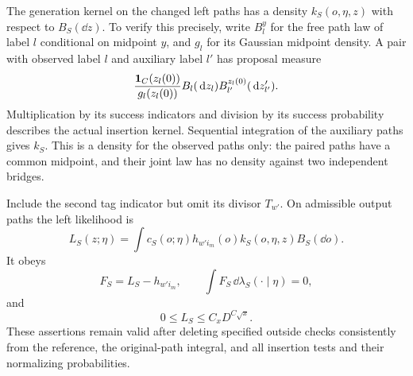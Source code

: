 The generation kernel on the changed left paths has a density
$k_S(o,\eta,z)$ with respect to $B_S(\dd z)$.  To verify this
precisely, write $B_l^y$ for the free path law of label $l$ conditional
on midpoint $y$, and $g_l$ for its Gaussian midpoint density.  A pair
with observed label $l$ and auxiliary label $l'$ has proposal measure
\begin{equation}\label{eq:local-proposal}
 \frac{\mathbf 1_C(z_l(0))}{g_l(z_l(0))}
                  B_l(\,\mathrm d z_l)B_{l'}^{z_l(0)}(\,\mathrm d z'_{l'}).
\end{equation}
Multiplication by its success indicators and division by its success
probability describes the actual insertion kernel.  Sequential
integration of the auxiliary paths gives $k_S$.  This is a density
for the observed paths only: the paired paths have a common midpoint,
and their joint law has no density against two independent bridges.

\begin{lemma}
\label{lem:local-likelihood}
Include the second tag indicator but omit its divisor $T_{w'}$.
On admissible output paths the left likelihood is
\begin{equation}\label{eq:local-likelihood}
 L_S(z;\eta)=\int c_S(o;\eta)h_{w'i_m}(o)
                      k_S(o,\eta,z)B_S(\dd o).
\end{equation}
It obeys
\begin{equation}\label{eq:local-centering}
 F_S=L_S-h_{w'i_m},\qquad
                 \int F_S\,\dd\lambda_S(\cdot\mid\eta)=0,
\end{equation}
and
\begin{equation}\label{eq:local-likelihood-bound}
                     0\le L_S\le C_xD^{C\sqrt x}.
\end{equation}
These assertions remain valid after deleting specified outside checks
consistently from the reference, the original-path integral, and all
insertion tests and their normalizing probabilities.
\end{lemma}

